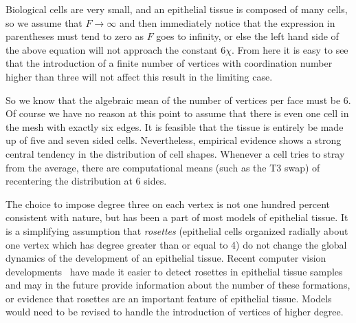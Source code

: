 Biological cells are very small, and an epithelial tissue is composed of many cells, so we assume that $F\to\infty$ and then immediately notice that the expression in parentheses must tend to zero as $F$ goes to infinity, or else the left hand side of the above equation will not approach the constant $6\chi$. From here it is easy to see that the introduction of a finite number of vertices with coordination number higher than three will not affect this result in the limiting case.

So we know that the algebraic mean of the number of vertices per face must be 6. Of course we have no reason at this point to assume that there is even one cell in the mesh with exactly six edges. It is feasible that the tissue is entirely be made up of five and seven sided cells. Nevertheless, empirical evidence shows a strong central tendency in the distribution of cell shapes. Whenever a cell tries to stray from the average, there are computational means (such as the T3 swap) of recentering the distribution at 6 sides.

The choice to impose degree three on each vertex is not one hundred percent consistent with nature, but has been a part of most models of epithelial tissue.  It is a simplifying assumption that \emph{rosettes} (epithelial cells organized radially about one vertex which has degree greater than or equal to 4) do not change the global dynamics of the development of an epithelial tissue.  Recent computer vision developments~\cite{rose} have made it easier to detect rosettes in epithelial tissue samples and may in the future provide information about the number of these formations, or evidence that rosettes are an important feature of epithelial tissue. Models would need to be revised to handle the introduction of vertices of higher degree.

